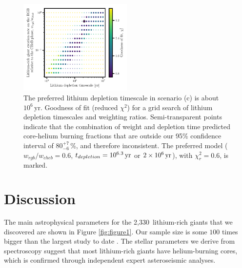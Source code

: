 \documentclass[twocolumn]{aastex62}
\newcommand{\SampleSize}{2,330}
\begin{document}
\begin{figure}
	\includegraphics[width=0.5\textwidth]{ref_bump_plus_8_scenario_c_grid_search}
	\caption{The preferred  lithium depletion timescale in scenario (c) is about $10^6$\,yr. Goodness of fit (reduced $\chi^2$) for a grid search of lithium depletion timescales and weighting ratios. Semi-transparent points indicate that the combination of weight and depletion time predicted core-helium burning fractions that are outside our 95\% confidence interval of $80^{+7}_{-6}$\,\%, and therefore inconsistent.  The preferred model ($w_{rgb}/w_{cheb} = 0.6$, $t_{depletion} = 10^{6.3}\,{\rm yr}$ or $2\times10^6\,{\rm yr}$), with $\chi_r^2 = 0.6$, is marked.}
	\label{fig:grid_search}
\end{figure}




\section{Discussion} \label{sec:discussion}

The main astrophysical parameters for the \SampleSize\ lithium-rich giants
that we discovered are shown in Figure \ref{fig:figure1}.  Our sample size
is some $100$ times bigger than the largest study to date \citep{Martell_2013}.
The stellar parameters we derive from spectroscopy suggest that most lithium-rich 
giants have helium-burning cores, which is confirmed through independent expert
asteroseismic analyses. 
\end{document}
